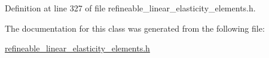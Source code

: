 Definition at line 327 of file refineable\+\_\+linear\+\_\+elasticity\+\_\+elements.\+h.



The documentation for this class was generated from the following file\+:\begin{DoxyCompactItemize}
\item 
\hyperlink{refineable__linear__elasticity__elements_8h}{refineable\+\_\+linear\+\_\+elasticity\+\_\+elements.\+h}\end{DoxyCompactItemize}

